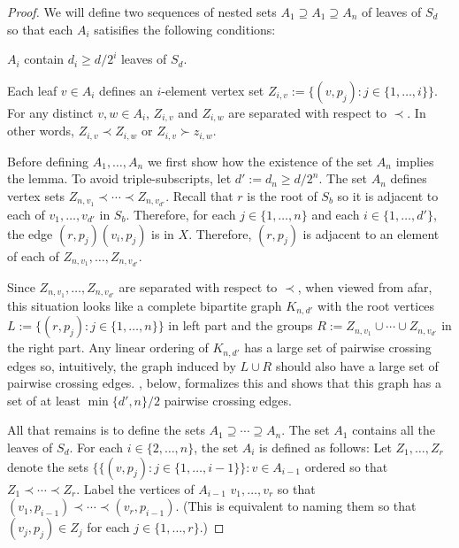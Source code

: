 \documentclass[kpfonts]{patmorin}
\begin{document}
\begin{proof}
    We will define two sequences of nested sets $A_1\supseteq A_1\supseteq A_{n}$ of leaves of $S_d$ so that each $A_i$ satisifies the following conditions:
    \begin{compactenum}[(C1)]
        \item $A_i$ contain $d_i\ge d/2^i$ leaves of $S_d$.
        \item Each leaf $v\in A_i$ defines an $i$-element vertex set $Z_{i,v}:=\{(v,p_j):j\in\{1,\ldots,i\}\}$.  For any distinct $v,w\in A_i$, $Z_{i,v}$ and $Z_{i,w}$ are separated with respect to $\prec$.  In other words, $Z_{i,v}\prec Z_{i,w}$ or $Z_{i,v}\succ z_{i,w}$.
    \end{compactenum}

    Before defining $A_1,\ldots,A_n$ we first show how the existence of the set $A_n$ implies the lemma.  To avoid triple-subscripts, let $d':=d_n\ge d/2^n$.   The set $A_n$ defines vertex sets $Z_{n,v_1}\prec\cdots\prec Z_{n,v_{d'}}$.  Recall that $r$ is the root of $S_b$ so it is adjacent to each of $v_{1},\ldots,v_{d'}$ in $S_b$.  Therefore, for each $j\in\{1,\ldots,n\}$ and each $i\in\{1,\ldots,d'\}$, the edge $(r,p_j)(v_i,p_j)$ is in $X$. Therefore, $(r,p_j)$ is adjacent to an element of each of $Z_{n,v_1},\ldots,Z_{n,v_{d'}}$.

    Since $Z_{n,v_1},\ldots,Z_{n,v_{d'}}$ are separated with respect to $\prec$, when viewed from afar, this situation looks like a complete bipartite graph $K_{n,d'}$ with the root vertices $L:=\{(r,p_j):j\in\{1,\ldots,n\}\}$ in left part and the groups $R:=Z_{n,v_1}\cup\cdots\cup Z_{n,v_{d'}}$ in the right part.  Any linear ordering of $K_{n,d'}$ has a large set of pairwise crossing edges so, intuitively, the graph induced by $L\cup R$ should also have a large set of pairwise crossing edges. , below, formalizes this and shows that this graph has a set of at least $\min\{d',n\}/2$ pairwise crossing edges.

    All that remains is to define the sets $A_1\supseteq\cdots\supseteq A_n$.  The set $A_1$ contains all the leaves of $S_d$.  For each $i\in\{2,\ldots,n\}$, the set $A_i$ is defined as follows:  Let $Z_1,\ldots,Z_r$ denote the sets $\{\{(v,p_j):j\in\{1,\ldots,i-1\}\}:v\in A_{i-1}$ ordered so that $Z_1\prec\cdots\prec Z_r$. Label the vertices of $A_{i-1}$ $v_1,\ldots,v_r$ so that $(v_1,p_{i-1})\prec\cdots\prec (v_r,p_{i-1})$. (This is equivalent to naming them so that $(v_j,p_j)\in Z_j$ for each $j\in\{1,\ldots,r\}$.)


\end{proof}
\end{document}
